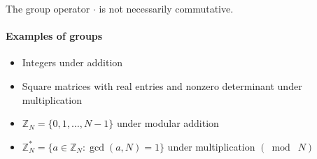 \documentclass[11pt]{article}
\newcommand{\ZZ}{\ensuremath{\mathds{Z}}}
\theoremstyle{remark}
\begin{document}
The group operator $\cdot$ is not necessarily commutative.

\paragraph{Examples of groups}

\begin{itemize}
\item Integers under addition
\item Square matrices with real entries and nonzero determinant under multiplication
\item $\ZZ_N=\{0,1,\ldots,N-1\}$ under modular addition
\item $\ZZ_N^*=\{a\in\ZZ_N:\gcd(a,N)=1\}$ under multiplication $(\bmod\;N)$
\end{itemize}
\end{document}
